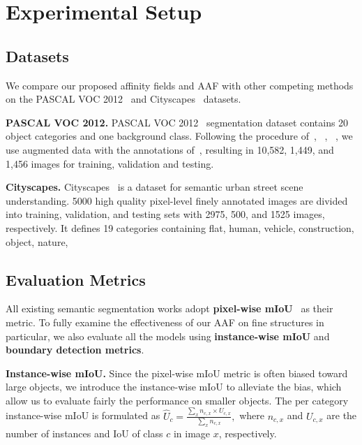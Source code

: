\section{Experimental Setup}
\label{sec:exp_setup}

\subsection{Datasets}
\label{subsec:datasets}
We compare our proposed affinity fields and AAF with other competing methods on the PASCAL VOC 2012~\cite{everingham2010pascal} and Cityscapes~\cite{Cordts2016Cityscapes} datasets.

\noindent
\textbf{PASCAL VOC 2012.}
\label{sec:voc}
PASCAL VOC 2012~\cite{everingham2010pascal} segmentation dataset contains 20 object categories and one background class. Following the procedure of~\cite{long2015fully}, ~\cite{zhao2016pyramid}, ~\cite{chen2016deeplab}, we use augmented data with the annotations of~\cite{hariharan2011semantic}, resulting in 10,582, 1,449, and 1,456 images for training, validation and testing. 

\noindent
\textbf{Cityscapes.}
\label{sec:cityscapes}
Cityscapes~\cite{Cordts2016Cityscapes} is a dataset for semantic urban street scene understanding.  5000 high quality
pixel-level finely annotated images are divided into  training, validation, and testing sets with 2975, 500, and 1525 images, respectively. It defines 19 categories containing flat, human, vehicle, construction, object, nature, \etc

\subsection{Evaluation Metrics}
\label{subsec:metrics}
All existing semantic segmentation works adopt \textbf{pixel-wise mIoU}~\cite{long2015fully} as their metric.  To fully examine the effectiveness of our AAF on fine structures in particular, we also evaluate all the models using \textbf{instance-wise mIoU} and \textbf{boundary detection metrics}.

\noindent
\textbf{Instance-wise mIoU.}
Since the pixel-wise mIoU metric is often biased toward large objects, we introduce the instance-wise mIoU to alleviate the bias, which allow us to evaluate fairly the performance on smaller objects. The per category instance-wise mIoU is formulated as $\hat{U}_c = \frac{\sum_x n_{c,x} \times U_{c,x}}{\sum_x n_{c,x}},$
where $n_{c,x}$ and $U_{c,x}$ are the number of instances and IoU of class $c$ in image $x$, respectively. 

